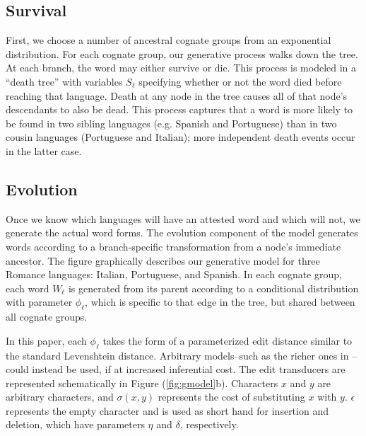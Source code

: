 \documentclass[11pt,a4paper]{article}
\begin{document}
\subsection{Survival}

First, we choose a number of ancestral cognate groups from an
exponential distribution.  For each cognate group, our generative
process walks down the tree.  At each branch, the word may either
survive or die.  This process is modeled in a ``death tree'' with
variables $S_\ell$ specifying whether or not the word died before
reaching that language. Death at any node in the tree causes all
of that node's descendants to also be dead.  This process captures
that a word is more likely to be found in two sibling languages
(e.g. Spanish and Portuguese) than in two cousin languages
(Portuguese and Italian); more independent death events occur in the latter case. 


\subsection{Evolution}

Once we know which languages will have an attested word and which
will not, we generate the actual word forms. The evolution component of
the model generates words according to a branch-specific transformation from a node's 
immediate ancestor.  The figure graphically describes our generative
model for three Romance languages: Italian, Portuguese, and Spanish.
In each cognate group, each word $W_\ell$ is generated from its
parent according to a conditional distribution with parameter $\phi_\ell$,
which is specific to that edge in the tree, but shared between all
cognate groups.

In this paper, each $\phi_\ell$ takes the form of a parameterized
edit distance similar to the standard Levenshtein distance.  Arbitrary
models--such as the richer ones in --could
instead be used, if at increased inferential cost.   The edit
transducers are represented schematically in Figure (\ref{fig:gmodel}b).
Characters $x$ and $y$ are arbitrary characters, and $\sigma(x,y)$
represents the cost of substituting $x$ with $y$.  $\epsilon$
represents the empty character and is used as short hand for insertion
and deletion, which have parameters $\eta$ and $\delta$, respectively.
\end{document}
